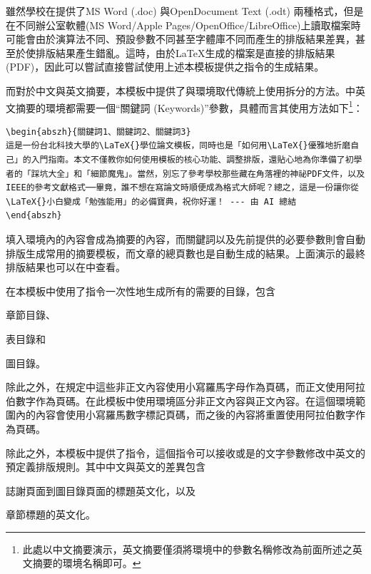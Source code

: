 \documentclass[12pt]{report}
\theoremstyle{plain}
\begin{document}
雖然學校在\cite{ntutsheet}提供了MS Word (.doc) 與OpenDocument Text (.odt) 兩種格式，但是在不同辦公室軟體(MS Word/Apple Pages/OpenOffice/LibreOffice)上讀取檔案時可能會由於演算法不同、預設參數不同甚至字體庫不同而產生的排版結果差異，甚至於使排版結果產生錯亂。這時，由於\LaTeX 生成的檔案是直接的排版結果(PDF)，因此可以嘗試直接嘗試使用上述本模板提供之指令的生成結果。

而對於中文與英文摘要，本模板中提供了與環境取代傳統上使用拆分的方法。中英文摘要的環境都需要一個``關鍵詞 (Keywords)''參數，具體而言其使用方法如下\footnote{此處以中文摘要演示，英文摘要僅須將環境中的參數名稱修改為前面所述之英文摘要的環境名稱即可。}：
\begin{lstlisting}
\begin{abszh}{關鍵詞1、關鍵詞2、關鍵詞3}
這是一份台北科技大學的\LaTeX{}學位論文模板，同時也是「如何用\LaTeX{}優雅地折磨自己」的入門指南。本文不僅教你如何使用模板的核心功能、調整排版，還貼心地為你準備了初學者的「踩坑大全」和「細節魔鬼」。當然，別忘了參考學校那些藏在角落裡的神祕PDF文件，以及IEEE的參考文獻格式──畢竟，誰不想在寫論文時順便成為格式大師呢？總之，這是一份讓你從\LaTeX{}小白變成「勉強能用」的必備寶典，祝你好運！ --- 由 AI 總結
\end{abszh}
\end{lstlisting}
填入環境內的內容會成為摘要的內容，而關鍵詞以及先前提供的必要參數則會自動排版生成常用的摘要模板，而文章的總頁數也是自動生成的結果。上面演示的最終排版結果也可以在中查看。

在本模板中使用了指令一次性地生成所有的需要的目錄，包含
\begin{enumerate*}
    \item 章節目錄、
    \item 表目錄和
    \item 圖目錄。
\end{enumerate*}
除此之外，在規定中這些非正文內容使用小寫羅馬字母作為頁碼，而正文使用阿拉伯數字作為頁碼。在此模板中使用環境區分非正文內容與正文內容。在這個環境範圍內的內容會使用小寫羅馬數字標記頁碼，而之後的內容將重置使用阿拉伯數字作為頁碼。

除此之外，本模板中提供了指令，這個指令可以接收或是的文字參數修改中英文的預定義排版規則。其中中文與英文的差異包含
\begin{enumerate*}
    \item 誌謝頁面到圖目錄頁面的標題英文化，以及
    \item 章節標題的英文化。
\end{enumerate*}
\end{document}
